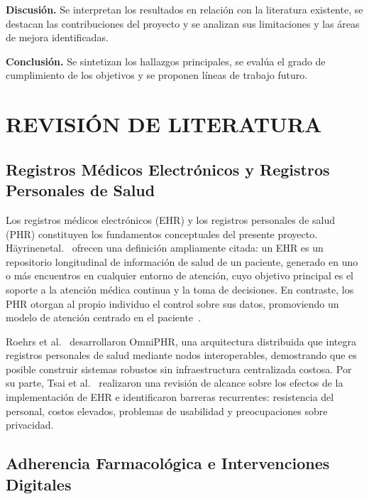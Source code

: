 \documentclass[12pt, letterpaper]{report}
\begin{document}
\medskip
\noindent\textbf{Discusión.} Se interpretan los resultados en relación con la
literatura existente, se destacan las contribuciones del proyecto y se analizan
sus limitaciones y las áreas de mejora identificadas.

\medskip
\noindent\textbf{Conclusión.} Se sintetizan los hallazgos principales, se evalúa
el grado de cumplimiento de los objetivos y se proponen líneas de trabajo futuro.

\chapter{REVISIÓN DE LITERATURA}

\section{Registros Médicos Electrónicos y Registros Personales de Salud}

Los registros médicos electrónicos (EHR) y los registros personales de salud (PHR)
constituyen los fundamentos conceptuales del presente proyecto. Häyrinenetal.~\cite{hayrinen2008definition}
ofrecen una definición ampliamente citada: un EHR es un repositorio longitudinal de
información de salud de un paciente, generado en uno o más encuentros en cualquier
entorno de atención, cuyo objetivo principal es el soporte a la atención médica continua
y la toma de decisiones. En contraste, los PHR otorgan al propio individuo el control
sobre sus datos, promoviendo un modelo de atención centrado en el
paciente~\cite{tang2006personal}.

Roehrs et al.~\cite{roehrs2017omniphr} desarrollaron OmniPHR, una arquitectura
distribuida que integra registros personales de salud mediante nodos interoperables,
demostrando que es posible construir sistemas robustos sin infraestructura centralizada
costosa. Por su parte, Tsai et al.~\cite{tsai2020effects} realizaron una revisión de
alcance sobre los efectos de la implementación de EHR e identificaron barreras
recurrentes: resistencia del personal, costos elevados, problemas de usabilidad y
preocupaciones sobre privacidad.

\section{Adherencia Farmacológica e Intervenciones Digitales}
\end{document}
